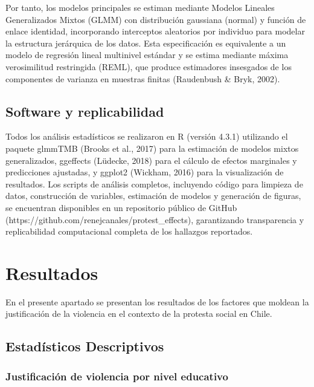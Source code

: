 \documentclass[
  13pt,
]{article}
\begin{document}
Por tanto, los modelos principales se estiman mediante Modelos Lineales
Generalizados Mixtos (GLMM) con distribución gaussiana (normal) y
función de enlace identidad, incorporando interceptos aleatorios por
individuo para modelar la estructura jerárquica de los datos. Esta
especificación es equivalente a un modelo de regresión lineal multinivel
estándar y se estima mediante máxima verosimilitud restringida (REML),
que produce estimadores insesgados de los componentes de varianza en
muestras finitas (Raudenbush \& Bryk, 2002).

\subsection{Software y replicabilidad}\label{software-y-replicabilidad}

Todos los análisis estadísticos se realizaron en R (versión 4.3.1)
utilizando el paquete glmmTMB (Brooks et al., 2017) para la estimación
de modelos mixtos generalizados, ggeffects (Lüdecke, 2018) para el
cálculo de efectos marginales y predicciones ajustadas, y ggplot2
(Wickham, 2016) para la visualización de resultados. Los scripts de
análisis completos, incluyendo código para limpieza de datos,
construcción de variables, estimación de modelos y generación de
figuras, se encuentran disponibles en un repositorio público de GitHub
(https://github.com/renejcanales/protest\_effects), garantizando
transparencia y replicabilidad computacional completa de los hallazgos
reportados.

\section{Resultados}\label{resultados}

En el presente apartado se presentan los resultados de los factores que
moldean la justificación de la violencia en el contexto de la protesta
social en Chile.

\subsection{Estadísticos
Descriptivos}\label{estaduxedsticos-descriptivos}

\subsubsection{Justificación de violencia por nivel
educativo}\label{justificaciuxf3n-de-violencia-por-nivel-educativo}
\end{document}
